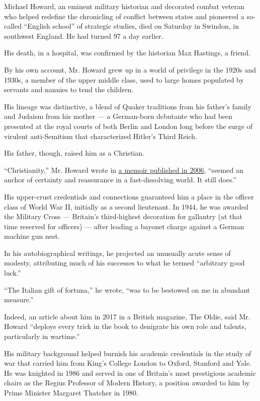 Michael Howard, an eminent military historian and decorated combat
veteran who helped redefine the chronicling of conflict between states
and pioneered a so-called ``English school'' of strategic studies, died
on Saturday in Swindon, in southwest England. He had turned 97 a day
earlier.

His death, in a hospital, was confirmed by the historian Max Hastings, a
friend.

By his own account, Mr. Howard grew up in a world of privilege in the
1920s and 1930s, a member of the upper middle class, used to large homes
populated by servants and nannies to tend the children.

His lineage was distinctive, a blend of Quaker traditions from his
father's family and Judaism from his mother --- a German-born debutante
who had been presented at the royal courts of both Berlin and London
long before the surge of virulent anti-Semitism that characterized
Hitler's Third Reich.

His father, though, raised him as a Christian.

``Christianity,'' Mr. Howard wrote in
\href{https://www.bloomsbury.com/us/captain-professor-9780826491251/}{a
memoir published in 2006}, ``seemed an anchor of certainty and
reassurance in a fast-dissolving world. It still does.''

His upper-crust credentials and connections guaranteed him a place in
the officer class of World War II, initially as a second lieutenant. In
1944, he was awarded the Military Cross --- Britain's third-highest
decoration for gallantry (at that time reserved for officers) --- after
leading a bayonet charge against a German machine gun nest.

In his autobiographical writings, he projected an unusually acute sense
of modesty, attributing much of his successes to what he termed
``arbitrary good luck.''

``The Italian gift of fortuna,'' he wrote, ``was to be bestowed on me in
abundant measure.''

Indeed, an article about him in 2017 in a British magazine, The Oldie,
said Mr. Howard ``deploys every trick in the book to denigrate his own
role and talents, particularly in wartime.''

His military background helped burnish his academic credentials in the
study of war that carried him from King's College London to Oxford,
Stanford and Yale. He was knighted in 1986 and served in one of
Britain's most prestigious academic chairs as the Regius Professor of
Modern History, a position awarded to him by Prime Minister Margaret
Thatcher in 1980.

